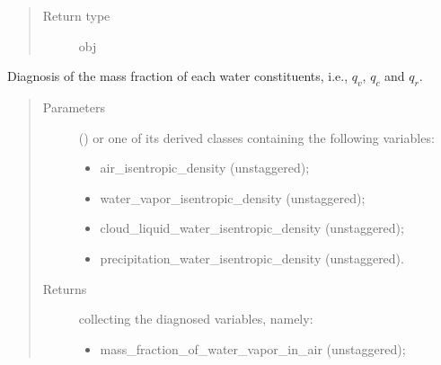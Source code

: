 \documentclass[letterpaper,10pt,english]{sphinxmanual}
\begin{document}
\begin{fulllineitems}
\begin{fulllineitems}
\begin{quote}
\begin{description}
\begin{itemize}
\end{itemize}


\item[{Return type}] \leavevmode
obj

\end{description}\end{quote}

\end{fulllineitems}


\begin{fulllineitems}
\label{\detokenize{api:dycore.diagnostic_isentropic.DiagnosticIsentropic.get_mass_fraction_of_water_constituents_in_air}}
Diagnosis of the mass fraction of each water constituents, i.e., \(q_v\), \(q_c\) and \(q_r\).
\begin{quote}\begin{description}
\item[{Parameters}] \leavevmode
{} () \textendash{} 
{\hyperref[\detokenize{api:storages.grid_data.GridData}]{}} or one of its derived classes containing the following variables:
\begin{itemize}
\item {} 
air\_isentropic\_density (unstaggered);

\item {} 
water\_vapor\_isentropic\_density (unstaggered);

\item {} 
cloud\_liquid\_water\_isentropic\_density (unstaggered);

\item {} 
precipitation\_water\_isentropic\_density (unstaggered).

\end{itemize}


\item[{Returns}] \leavevmode

{\hyperref[\detokenize{api:storages.grid_data.GridData}]{}} collecting the diagnosed variables, namely:
\begin{itemize}
\item {} 
mass\_fraction\_of\_water\_vapor\_in\_air (unstaggered);


\end{itemize}
\end{description}
\end{quote}
\end{fulllineitems}
\end{fulllineitems}
\end{document}
